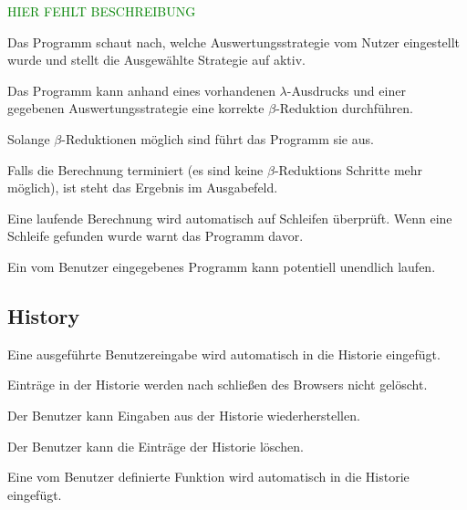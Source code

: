 \documentclass[parskip=full,11pt,twoside]{scrartcl}
\begin{document}
\textcolor{green}{HIER FEHLT BESCHREIBUNG}

Das Programm schaut nach, welche Auswertungsstrategie vom Nutzer eingestellt wurde und stellt die Ausgewählte Strategie auf aktiv.

Das Programm kann anhand eines vorhandenen $\lambda$-Ausdrucks und einer gegebenen Auswertungsstrategie eine korrekte $\beta$-Reduktion durchführen.

Solange $\beta$-Reduktionen möglich sind führt das Programm sie aus.

Falls die Berechnung terminiert (es sind keine $\beta$-Reduktions Schritte mehr möglich), ist steht das Ergebnis im Ausgabefeld.

Eine laufende Berechnung wird automatisch auf Schleifen überprüft. Wenn eine Schleife gefunden wurde warnt das Programm davor.

Ein vom Benutzer eingegebenes Programm kann potentiell unendlich laufen.




\subsection{History}

Eine ausgeführte Benutzereingabe wird automatisch in die Historie eingefügt.

Einträge in der Historie werden nach schließen des Browsers nicht gelöscht.

Der Benutzer kann Eingaben aus der Historie wiederherstellen.

Der Benutzer kann die Einträge der Historie löschen.

Eine vom Benutzer definierte Funktion wird automatisch in die Historie eingefügt.
\end{document}
